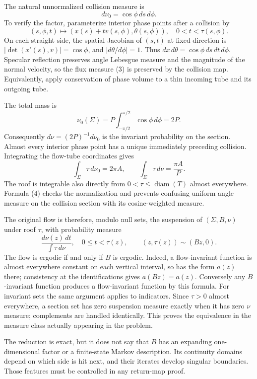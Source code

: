 \documentclass[11pt]{article}
\begin{document}
The natural unnormalized collision measure is
\[
 d\nu_0=\cos\phi\,ds\,d\phi.                            \tag{3}
\]
To verify the factor, parameterize interior phase points after a collision by
\[
 (s,\phi,t)\longmapsto(x(s)+t v(s,\phi),\theta(s,\phi)),
 \quad0<t<\tau(s,\phi).
\]
On each straight side, the spatial Jacobian of $(s,t)$ at fixed direction is $|\det(x'(s),v)|=\cos\phi$, and $|d\theta/d\phi|=1$. Thus $dx\,d\theta=\cos\phi\,ds\,dt\,d\phi$. Specular reflection preserves angle Lebesgue measure and the magnitude of the normal velocity, so the flux measure (3) is preserved by the collision map. Equivalently, apply conservation of phase volume to a thin incoming tube and its outgoing tube.

The total mass is
\[
 \nu_0(\Sigma)=P\int_{-\pi/2}^{\pi/2}\cos\phi\,d\phi=2P.
\]
Consequently $d\nu=(2P)^{-1}d\nu_0$ is the invariant probability on the section. Almost every interior phase point has a unique immediately preceding collision. Integrating the flow-tube coordinates gives
\[
 \int_\Sigma\tau\,d\nu_0=2\pi A,
 \qquad \int_\Sigma\tau\,d\nu=\frac{\pi A}{P}.            \tag{4}
\]
The roof is integrable also directly from $0<\tau\leq\operatorname{diam}(T)$ almost everywhere. Formula (4) checks the normalization and prevents confusing uniform angle measure on the collision section with its cosine-weighted measure.

The original flow is therefore, modulo null sets, the suspension of $(\Sigma,B,\nu)$ under roof $\tau$, with probability measure
\[
 \frac{d\nu(z)\,dt}{\int\tau\,d\nu},\quad
 0\leq t<\tau(z),\qquad (z,\tau(z))\sim(Bz,0).           \tag{5}
\]
The flow is ergodic if and only if $B$ is ergodic. Indeed, a flow-invariant function is almost everywhere constant on each vertical interval, so has the form $a(z)$ there; consistency at the identifications gives $a(Bz)=a(z)$. Conversely any $B$-invariant function produces a flow-invariant function by this formula. For invariant sets the same argument applies to indicators. Since $\tau>0$ almost everywhere, a section set has zero suspension measure exactly when it has zero $\nu$ measure; complements are handled identically. This proves the equivalence in the measure class actually appearing in the problem.

The reduction is exact, but it does not say that $B$ has an expanding one-dimensional factor or a finite-state Markov description. Its continuity domains depend on which side is hit next, and their iterates develop singular boundaries. Those features must be controlled in any return-map proof.
\end{document}
